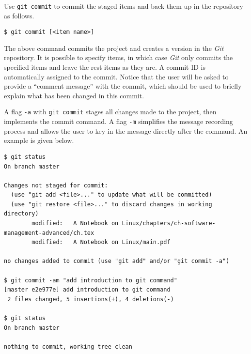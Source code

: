 Use \verb|git commit| to commit the staged items and back them up in the repository as follows.
\begin{lstlisting}
$ git commit [<item name>]
\end{lstlisting}
The above command commits the project and creates a version in the \textit{Git} repository. It is possible to specify items, in which case \textit{Git} only commits the specified items and leave the rest items as they are. A commit ID is automatically assigned to the commit. Notice that the user will be asked to provide a ``comment message'' with the commit, which should be used to briefly explain what has been changed in this commit.

A flag \verb|-a| with \verb|git commit| stages all changes made to the project, then implements the commit command. A flag \verb|-m| simplifies the message recording process and allows the user to key in the message directly after the command. An example is given below.
\begin{lstlisting}
$ git status
On branch master

Changes not staged for commit:
  (use "git add <file>..." to update what will be committed)
  (use "git restore <file>..." to discard changes in working directory)
        modified:   A Notebook on Linux/chapters/ch-software-management-advanced/ch.tex
        modified:   A Notebook on Linux/main.pdf

no changes added to commit (use "git add" and/or "git commit -a")

$ git commit -am "add introduction to git command"
[master e2e977e] add introduction to git command
 2 files changed, 5 insertions(+), 4 deletions(-)

$ git status
On branch master

nothing to commit, working tree clean
\end{lstlisting}

